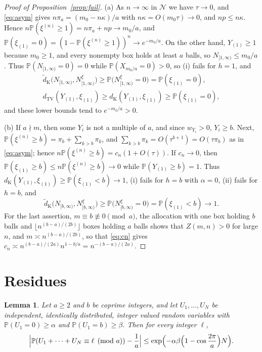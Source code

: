 \documentclass[11pt]{amsart}
\newtheorem{lemma}[theorem]{Lemma}
\theoremstyle{definition}
\theoremstyle{remark}
\numberwithin{equation}{section}
\newcommand{\Pp}{\mathbb P}
\newcommand{\cN}{\mathcal N}
\newcommand{\dtv}{d_{\mathrm{TV}}}
\newcommand{\dK}{d_{\mathrm K}}
\newcommand{\dKt}{\tilde d_{\mathrm K}}
\begin{document}
\begin{proof}[Proof of Proposition~\ref{prop:fail}]
(a) As $n\to\infty$ in $\cN$ we have $\tau\to0$, and \eqref{eq:asym} gives $n\pi_a=(m_0-n\kappa)/a$ with $n\kappa=O(m_0\tau)\to0$, and $np\le n\kappa$. Hence $n\Pp(\xi^{(n)}\ge1)=n\pi_a+np\to m_0/a$, and $\Pp(\xi_{(1)}=0)=(1-\Pp(\xi^{(n)}\ge1))^n\to e^{-m_0/a}$. On the other hand, $Y_{(1)}\ge1$ because $m_0\ge1$, and every nonempty box holds at least $a$ balls, so $N_{[1,\infty)}\le m_0/a$. Thus $\Pp(N_{[1,\infty)}=0)=0$ while $\Pp(X_{m_0/a}=0)>0$, so (i) fails for $h=1$, and
\begin{gather*}
\dKt\bigl(N_{[1,\infty)},N^\xi_{[1,\infty)}\bigr)\ge\Pp\bigl(N^\xi_{[1,\infty)}=0\bigr)=\Pp(\xi_{(1)}=0),\\
\dtv(Y_{(1)},\xi_{(1)})\ge\dK(Y_{(1)},\xi_{(1)})\ge\Pp(\xi_{(1)}=0),
\end{gather*}
and these lower bounds tend to $e^{-m_0/a}>0$.

(b) If $a\nmid m$, then some $Y_i$ is not a multiple of $a$, and since $w_{Y_i}>0$, $Y_i\ge b$. Next, $\Pp(\xi^{(n)}\ge b)=\pi_b+\sum_{k>b}\pi_k$, and $\sum_{k>b}\pi_k=O(\tau^{b+1})=O(\tau\pi_b)$ as in \eqref{eq:asym}; hence $n\Pp(\xi^{(n)}\ge b)=c_n(1+O(\tau))$. If $c_n\to0$, then $\Pp(\xi_{(1)}\ge b)\le n\Pp(\xi^{(n)}\ge b)\to0$ while $\Pp(Y_{(1)}\ge b)=1$. Thus $\dK(Y_{(1)},\xi_{(1)})\ge\Pp(\xi_{(1)}<b)\to1$, (i) fails for $h=b$ with $\alpha=0$, (ii) fails for $h=b$, and
\[
\dKt\bigl(N_{[b,\infty)},N^\xi_{[b,\infty)}\bigr)\ge\Pp\bigl(N^\xi_{[b,\infty)}=0\bigr)=\Pp(\xi_{(1)}<b)\to1.
\]
For the last assertion, $m\equiv b\not\equiv0\pmod a$, the allocation with one box holding $b$ balls and $\lfloor n^{(b-a)/(2b)}\rfloor$ boxes holding $a$ balls shows that $Z(m,n)>0$ for large $n$, and $m\asymp n^{(b-a)/(2b)}$, so that \eqref{eq:cn} gives $c_n\asymp n^{(b-a)/(2a)}n^{1-b/a}=n^{-(b-a)/(2a)}$.
\end{proof}

\section{Residues}\label{sec:resid}

\begin{lemma}\label{lem:resid}
Let $a\ge2$ and $b$ be coprime integers, and let $U_1,\dots,U_N$ be independent, identically distributed, integer valued random variables with $\Pp(U_1=0)\ge\alpha$ and $\Pp(U_1=b)\ge\beta$. Then for every integer $\ell$,
\[
\Bigl|\Pp(U_1+\dots+U_N\equiv\ell\pmod a)-\frac1a\Bigr|\le\exp\Bigl(-\alpha\beta\Bigl(1-\cos\frac{2\pi}a\Bigr)N\Bigr).
\]
\end{lemma}
\end{document}

